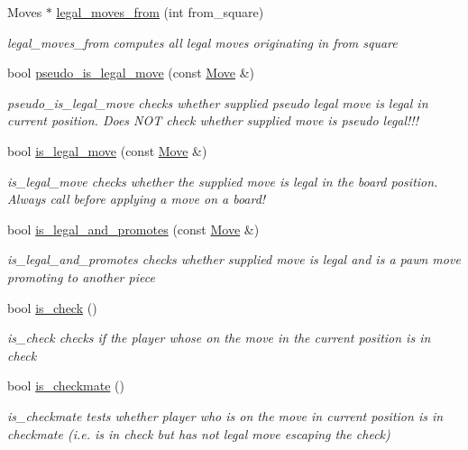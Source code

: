 \begin{DoxyCompactItemize}
Moves $\ast$ \hyperlink{classchess_1_1Board_a354b83ee53ba1f0ff7a7d0bac148d758}{legal\-\_\-moves\-\_\-from} (int from\-\_\-square)
\begin{DoxyCompactList}\small\item\em legal\-\_\-moves\-\_\-from computes all legal moves originating in from square \end{DoxyCompactList}\item 
bool \hyperlink{classchess_1_1Board_a804f9b6cceeef5f3f5d866d16e1097a2}{pseudo\-\_\-is\-\_\-legal\-\_\-move} (const \hyperlink{classchess_1_1Move}{Move} \&)
\begin{DoxyCompactList}\small\item\em pseudo\-\_\-is\-\_\-legal\-\_\-move checks whether supplied pseudo legal move is legal in current position. Does N\-O\-T check whether supplied move is pseudo legal!!! \end{DoxyCompactList}\item 
bool \hyperlink{classchess_1_1Board_acd8243ca7cdd3fa72f07aa5f225a750a}{is\-\_\-legal\-\_\-move} (const \hyperlink{classchess_1_1Move}{Move} \&)
\begin{DoxyCompactList}\small\item\em is\-\_\-legal\-\_\-move checks whether the supplied move is legal in the board position. Always call before applying a move on a board! \end{DoxyCompactList}\item 
bool \hyperlink{classchess_1_1Board_ae338726c0c954644b99342c9760d5924}{is\-\_\-legal\-\_\-and\-\_\-promotes} (const \hyperlink{classchess_1_1Move}{Move} \&)
\begin{DoxyCompactList}\small\item\em is\-\_\-legal\-\_\-and\-\_\-promotes checks whether supplied move is legal and is a pawn move promoting to another piece \end{DoxyCompactList}\item 
bool \hyperlink{classchess_1_1Board_af12b1804d1edf018dbb348055cf88025}{is\-\_\-check} ()
\begin{DoxyCompactList}\small\item\em is\-\_\-check checks if the player whose on the move in the current position is in check \end{DoxyCompactList}\item 
bool \hyperlink{classchess_1_1Board_a24673c511d27445702013a7569f7291b}{is\-\_\-checkmate} ()
\begin{DoxyCompactList}\small\item\em is\-\_\-checkmate tests whether player who is on the move in current position is in checkmate (i.\-e. is in check but has not legal move escaping the check) \end{DoxyCompactList}\item 

\end{DoxyCompactItemize}
